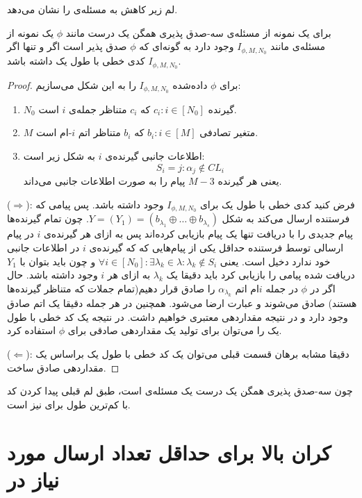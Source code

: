 لم زیر کاهش به مسئله‌ی
\picod
را نشان می‌دهد.
\begin{lemma}
	برای یک نمونه از مسئله‌ی سه-صدق پذیری همگن یک درست مانند
	$\phi$
	یک نمونه از مسئله‌ی
	\picod
	مانند
	$I_{\phi, M, N_0}$
	وجود دارد به گونه‌ای که 
	$\phi$
	صدق پذیر است اگر و تنها اگر 
	$I_{\phi, M, N_0}$
	کدی خطی با طول یک داشته باشد.
\end{lemma}
\begin{proof}
	برای
	$\phi$
	داده‌شده
		$I_{\phi, M, N_0}$
		را به این شکل می‌سازیم:
		\begin{enumerate}
			\item
			$N_0$
			گیرنده
			$c_i: i \in [N_0]$
			که
			$c_i$
			متناظر جمله‌ی
			$i$
			است.
			\item
			$M$
			متغیر تصادفی
			$b_i: i \in [M]$
			 که 
			 $b_i$
			 متناظر اتم‌
			 $i$-ام
			 است.
			 \item 
			 اطلاعات جانبی گیرنده‌ی
			 $i$
			 به شکل زیر است:
			 $$S_i = {j: \alpha_j \notin CL_i}$$
			 یعنی هر گیرنده
			 $M - 3$
			 پیام را به صورت اطلاعات جانبی می‌داند.
		\end{enumerate}
		($\Rightarrow$):
		فرض کنید کدی خطی با طول یک برای
			$I_{\phi, M, N_0}$
			وجود داشته باشد. پس پیامی که فرستنده ارسال می‌کند به شکل
			$Y = (Y_1) = (b_{\lambda_1} \oplus \ldots \oplus b_{\lambda_s})$.
			چون تمام گیرنده‌ها پیام جدیدی را با دریافت تنها یک پیام بازیابی کرده‌اند پس به ازای هر گیرنده‌ی $i$ در پیام ارسالی توسط فرستنده حداقل یکی از پیام‌هایی که که گیرنده‌ی $i$ در اطلاعات جانبی خود ندارد دخیل است. یعنی
			$\forall i \in [N_0]: \exists \lambda_k \in \lambda: \lambda_k \notin S_i$
			و چون باید بتوان با 
			$Y_1$
			دریافت شده پیامی را بازیابی کرد باید دقیقا یک
			$\lambda_k$
			به ازای هر
			$i$
			وجود داشته باشد. حال اگر در
			$\phi$
			در جمله
			$i$ام اتم
			$\alpha_{\lambda_k}$
			را صادق قرار دهیم(تمام جملات که متناظر گیرنده‌ها هستند) صادق می‌شوند و عبارت ارضا می‌شود. همچنین در هر جمله دقیقا یک اتم صادق وجود دارد و در نتیجه مقداردهی معتبری خواهیم داشت. در نتیجه یک کد خطی با طول یک را می‌توان برای تولید یک مقداردهی صادقی برای
			$\phi$
			استفاده کرد.
			
			($\Leftarrow$):
			دقیقا مشابه برهان قسمت قبلی می‌توان یک کد خطی با طول یک براساس یک مقداردهی صادق ساخت.
\end{proof}
چون سه-صدق پذیری همگن یک درست یک مسئله‌ی
\nphard
است، طبق لم قبلی پیدا کردن کد با کم‌ترین طول برای
\lpicod 
نیز
\nphard
است.
\section{کران بالا برای حداقل تعداد ارسال مورد نیاز در
\picod}
